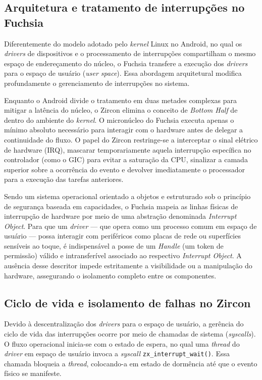 \documentclass[12pt,a4paper]{article}
\begin{document}
\subsection{Arquitetura e tratamento de interrupções no Fuchsia}

Diferentemente do modelo adotado pelo \emph{kernel} Linux no Android, no qual os
\emph{drivers} de dispositivos e o processamento de interrupções compartilham o
mesmo espaço de endereçamento do núcleo, o Fuchsia transfere a execução dos
\emph{drivers} para o espaço de usuário (\emph{user space}). Essa abordagem
arquitetural modifica profundamente o gerenciamento de interrupções no sistema.

Enquanto o Android divide o tratamento em duas metades complexas para mitigar a
latência do núcleo, o Zircon elimina o conceito de \emph{Bottom Half} de dentro
do ambiente do \emph{kernel}. O micronúcleo do Fuchsia executa apenas o mínimo
absoluto necessário para interagir com o hardware antes de delegar a
continuidade do fluxo. O papel do Zircon restringe-se a interceptar o sinal
elétrico de hardware (IRQ), mascarar temporariamente aquela interrupção
específica no controlador (como o GIC) para evitar a saturação da CPU, sinalizar
a camada superior sobre a ocorrência do evento e devolver imediatamente o
processador para a execução das tarefas anteriores.

Sendo um sistema operacional orientado a objetos e estruturado sob o princípio
de segurança baseada em capacidades, o Fuchsia mapeia as linhas físicas de
interrupção de hardware por meio de uma abstração denominada \emph{Interrupt
Object}. Para que um \emph{driver} --- que opera como um processo comum em
espaço de usuário --- possa interagir com periféricos como placas de rede ou
superfícies sensíveis ao toque, é indispensável a posse de um \emph{Handle} (um
token de permissão) válido e intransferível associado ao respectivo
\emph{Interrupt Object}. A ausência desse descritor impede estritamente a
visibilidade ou a manipulação do hardware, assegurando o isolamento completo
entre os componentes.

\subsection{Ciclo de vida e isolamento de falhas no Zircon}

Devido à descentralização dos \emph{drivers} para o espaço de usuário, a
gerência do ciclo de vida das interrupções ocorre por meio de chamadas de
sistema (\emph{syscalls}). O fluxo operacional inicia-se com o estado de espera,
no qual uma \emph{thread} do \emph{driver} em espaço de usuário invoca a
\emph{syscall} \texttt{zx\_interrupt\_wait()}. Essa chamada bloqueia a
\emph{thread}, colocando-a em estado de dormência até que o evento físico se
manifeste.
\end{document}
